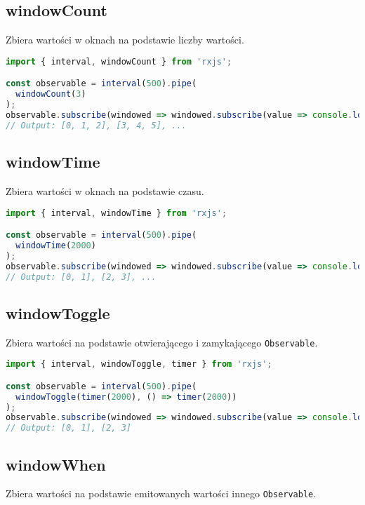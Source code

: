 \documentclass[a4paper,12pt]{article}
\begin{document}
\subsection{windowCount}
Zbiera wartości w oknach na podstawie liczby wartości.

\begin{lstlisting}[language=JavaScript, caption=Przykład użycia \texttt{windowCount}]
import { interval, windowCount } from 'rxjs';

const observable = interval(500).pipe(
  windowCount(3)
);
observable.subscribe(windowed => windowed.subscribe(value => console.log(value)));
// Output: [0, 1, 2], [3, 4, 5], ...
\end{lstlisting}

\subsection{windowTime}
Zbiera wartości w oknach na podstawie czasu.

\begin{lstlisting}[language=JavaScript, caption=Przykład użycia \texttt{windowTime}]
import { interval, windowTime } from 'rxjs';

const observable = interval(500).pipe(
  windowTime(2000)
);
observable.subscribe(windowed => windowed.subscribe(value => console.log(value)));
// Output: [0, 1], [2, 3], ...
\end{lstlisting}

\subsection{windowToggle}
Zbiera wartości na podstawie otwierającego i zamykającego \texttt{Observable}.

\begin{lstlisting}[language=JavaScript, caption=Przykład użycia \texttt{windowToggle}]
import { interval, windowToggle, timer } from 'rxjs';

const observable = interval(500).pipe(
  windowToggle(timer(2000), () => timer(2000))
);
observable.subscribe(windowed => windowed.subscribe(value => console.log(value)));
// Output: [0, 1], [2, 3]
\end{lstlisting}

\subsection{windowWhen}
Zbiera wartości na podstawie emitowanych wartości innego \texttt{Observable}.
\end{document}
